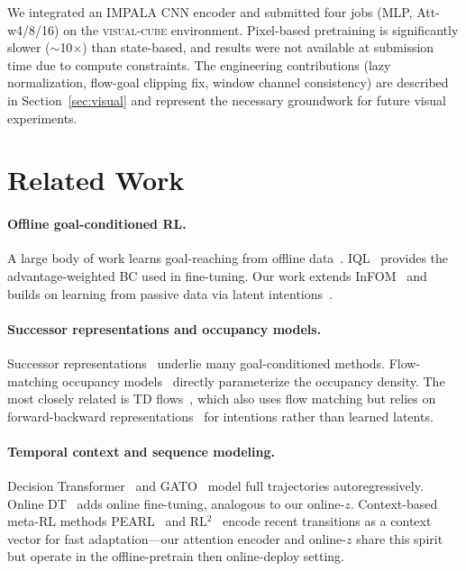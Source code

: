 \documentclass{article}
\newcommand{\base}{InFOM}
\begin{document}
We integrated an IMPALA CNN encoder and submitted four jobs
(MLP, Att-w4/8/16) on the \textsc{visual-cube} environment.
Pixel-based pretraining is significantly slower ($\sim$10$\times$)
than state-based, and results were not available at submission time
due to compute constraints.
The engineering contributions (lazy normalization, flow-goal clipping
fix, window channel consistency) are described in Section~\ref{sec:visual}
and represent the necessary groundwork for future visual experiments.

\section{Related Work}
\label{sec:related}

\paragraph{Offline goal-conditioned RL.}
A large body of work learns goal-reaching from offline
data~\citep{ghosh2021gcsl,park2023hiql,eysenbach2022contrastive,park2025ogbenchbenchmarkingofflinegoalconditioned}.
IQL~\citep{kostrikov2021iql} provides the advantage-weighted BC used in fine-tuning.
Our work extends \base{}~\citep{zheng2025infom} and builds on
learning from passive data via latent intentions~\citep{ghosh2023passive}.

\paragraph{Successor representations and occupancy models.}
Successor representations~\citep{dayan1993successor,barreto2017sf}
underlie many goal-conditioned methods.
Flow-matching occupancy
models~\citep{farebrother2025tdflows,park2025flowq,dong2025valueflows}
directly parameterize the occupancy density.
The most closely related is TD flows~\citep{farebrother2025tdflows},
which also uses flow matching but relies on forward-backward
representations~\citep{touati2021fb} for intentions rather than learned latents.

\paragraph{Temporal context and sequence modeling.}
Decision Transformer~\citep{chen2021dt} and GATO~\citep{reed2022gato}
model full trajectories autoregressively.
Online DT~\citep{zheng2022odt} adds online fine-tuning, analogous to
our online-$z$.
Context-based meta-RL methods PEARL~\citep{rakelly2019pearl} and
RL$^2$~\citep{duan2016rl2} encode recent transitions as a context
vector for fast adaptation---our attention encoder and online-$z$ share
this spirit but operate in the offline-pretrain then online-deploy setting.
\end{document}
